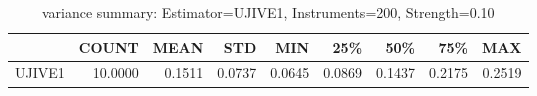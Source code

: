 \begin{table}[ht]
\centering
\caption{variance summary: Estimator=UJIVE1, Instruments=200, Strength=0.10}
\begin{tabular}{lrrrrrrrr}
\toprule
 & COUNT & MEAN & STD & MIN & 25\% & 50\% & 75\% & MAX \\
\midrule
UJIVE1 & 10.0000 & 0.1511 & 0.0737 & 0.0645 & 0.0869 & 0.1437 & 0.2175 & 0.2519 \\
\bottomrule
\end{tabular}
\end{table}
